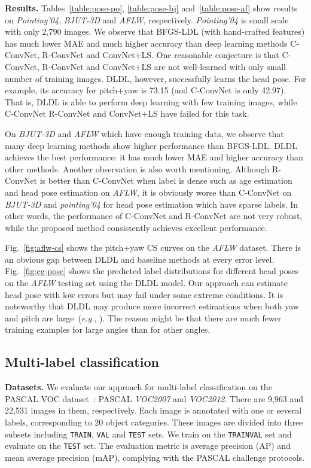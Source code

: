 \documentclass[journal]{IEEEtran}
\begin{document}
\textbf{Results.} Tables~\ref{table:pose-po}, \ref{table:pose-bj} and~\ref{table:pose-af} show results on \emph{Pointing'04}, \emph{BJUT-3D} and \emph{AFLW}, respectively. \emph{Pointing'04} is small scale with only 2,790 images. We observe that BFGS-LDL (with hand-crafted features) has much lower MAE and much higher accuracy than deep learning methods C-ConvNet, R-ConvNet and ConvNet+LS. One reasonable conjecture is that C-ConvNet, R-ConvNet and ConvNet+LS are not well-learned with only small number of training images. DLDL, however, successfully learns the head pose. For example, its accuracy for pitch+yaw is 73.15 (and C-ConvNet is only 42.97). That is, DLDL is able to perform deep learning with few training images, while C-ConvNet R-ConvNet and ConvNet+LS have failed for this task.

On \emph{BJUT-3D} and \emph{AFLW} which have enough training data, we observe that many deep learning methods show higher performance than BFGS-LDL. DLDL achieves the best performance: it has much lower MAE and higher accuracy than other methods. Another observation is also worth mentioning. Although R-ConvNet is better than C-ConvNet when label is dense such as age estimation and head pose estimation on \emph{AFLW}, it is obviously worse than C-ConvNet on \emph{BJUT-3D} and \emph{pointing'04} for head pose estimation which have sparse labels. In other words, the performance of C-ConvNet and R-ConvNet are not very robust, while the proposed method consistently achieves excellent performance.

Fig.~\ref{fig:aflw-cs} shows the pitch+yaw CS curves on the \emph{AFLW} dataset. There is an obvious gap between DLDL and baseline methods at every error level. Fig.~\ref{fig:eg-pose} shows the predicted label distributions for different head poses on the \emph{AFLW} testing set using the DLDL model. Our approach can estimate head pose with low errors but may fail under some extreme conditions. It is noteworthy that DLDL may produce more incorrect estimations when both yaw and pitch are large~(\emph{e.g.}, ). The reason might be that there are much fewer training examples for large angles than for other angles.

\subsection{Multi-label classification}
\textbf{Datasets.} We evaluate our approach for multi-label classification on the PASCAL VOC dataset~\cite{everingham2010pascal}: PASCAL \emph{VOC2007} and \emph{VOC2012}. There are 9,963 and 22,531 images in them, respectively. Each image is annotated with one or several labels, corresponding to 20 object categories. These images are divided into three subsets including \texttt{TRAIN}, \texttt{VAL} and \texttt{TEST} sets. We train on the \texttt{TRAINVAL} set and evaluate on the \texttt{TEST} set. The evaluation metric is average precision (AP) and mean average precision (mAP), complying with the PASCAL challenge protocols.
\end{document}
